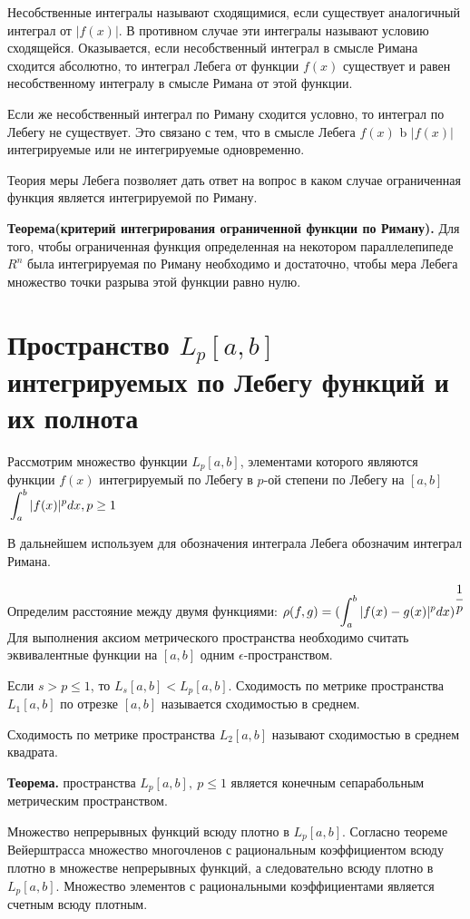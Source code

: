 \documentclass[12pt]{report}
\renewcommand{\[}{$\\\displaystyle}
\renewcommand{\]}{\\$}
\renewcommand{\[}{$\\\displaystyle}
\newcommand{\sep}{,\ }
\newcommand{\tth}[1][]{\textbf{Теорема#1.}}
\begin{document}
Несобственные интегралы называют сходящимися, если существует аналогичный интеграл от $|f(x)|$. В противном случае эти интегралы называют условию сходящейся. Оказывается, если несобственный интеграл в смысле Римана сходится абсолютно, то интеграл Лебега от функции $f(x)$ существует и равен несобственному интегралу в смысле Римана от этой функции.

Если же несобственный интеграл по Риману сходится условно, то интеграл по Лебегу не существует. Это связано с тем, что в смысле Лебега $f(x)$ b $|f(x)|$ интегрируемые или не интегрируемые одновременно.

Теория меры Лебега позволяет дать ответ на вопрос в каком случае ограниченная функция является интегрируемой по Риману.

\tth[(критерий интегрирования ограниченной функции по Риману)] Для того, чтобы ограниченная функция определенная на некотором параллелепипеде $R^n$ была интегрируемая по Риману необходимо и достаточно, чтобы мера Лебега множество точки разрыва этой функции равно нулю.

\section{Пространство $L_p[a,b]$ интегрируемых по Лебегу функций и их полнота}

Рассмотрим множество функции $L_p[a,b]$, элементами которого являются функции $f(x)$ интегрируемый по Лебегу в $p$-ой степени по Лебегу на $[a,b]$
\[\int_a^b |f(x)|^p dx, p \geq 1\]

В дальнейшем используем для обозначения интеграла Лебега обозначим интеграл Римана.

Определим расстояние между двумя функциями:
\[\rho(f,g)= ( \int_a^b |f(x) - g(x)|^p dx ) ^{\cfrac{1}{p}}\]
Для выполнения аксиом метрического пространства необходимо считать эквивалентные функции на $[a,b]$ одним $\epsilon$-пространством.

Если $s>p\leq 1$, то $L_s[a,b]< L_p[a,b]$. Сходимость по метрике пространства $L_1[a,b]$ по отрезке $[a,b]$ называется сходимостью в среднем.

Сходимость по метрике пространства $L_2[a,b]$ называют сходимостью в среднем квадрата.

\tth[] пространства $L_p[a,b] \sep p \leq 1$ является конечным сепарабольным метрическим пространством.

Множество непрерывных функций всюду плотно в $L_p[a,b]$. Согласно теореме Вейерштрасса множество многочленов с рациональным коэффициентом всюду плотно в множестве непрерывных функций, а следовательно всюду плотно в $L_p[a,b]$. Множество элементов с рациональными коэффициентами является счетным всюду плотным.
\end{document}
